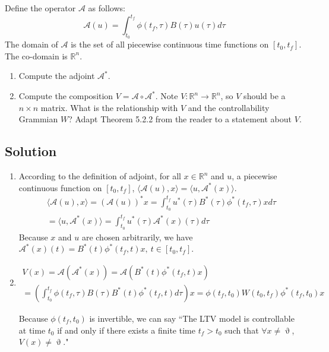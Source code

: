 \documentclass[11pt]{report}
\newcommand{\mc}{\mathcal}
\newcommand{\mb}{\mathbb}
\begin{document}
Define the operator $\mc{A}$ as follows:
\[
\mc{A}(u) = \int_{t_0}^{t_f} \phi(t_f,\tau) B(\tau) u(\tau) d\tau
\]
The domain of $\mc{A}$ is the set of all piecewise continuous time functions on $[t_0,t_f]$. The co-domain is $\mb{R}^n$.

\begin{enumerate}[label=\alph*)]
\item
Compute the adjoint $\mc{A}^*$.
\item
Compute the composition $V = \mc{A} \circ \mc{A}^*$. Note $V: \mb{R}^n \rightarrow \mb{R}^n$, so $V$ should be a $n \times n$ matrix. What is the relationship with $V$ and the controllability Grammian $W$? Adapt Theorem 5.2.2 from the reader to a statement about $V$.
\end{enumerate}


\subsection*{Solution}
\begin{enumerate}[label=\alph*)]
\item
According to the definition of adjoint, for all $x \in \mb{R}^n$ and $u$, a piecewise continuous function on $[t_0,t_f]$, $\langle\mc{A}(u), x\rangle = \langle u, \mc{A}^*(x)\rangle$.
\begin{multline*}
  \langle\mc{A}(u), x\rangle = (\mc{A}(u))^* x = \int_{t_0}^{t_f} u^*(\tau) B^*(\tau) \phi^*(t_f,\tau) x d\tau\\
  = \langle u, \mc{A}^*(x)\rangle = \int_{t_0}^{t_f} u^*(\tau) \mc{A}^*(x)(\tau) d\tau
\end{multline*}
Because $x$ and $u$ are chosen arbitrarily, we have $\mc{A}^*(x)(t) = B^*(t) \phi^*(t_f,t) x,~t \in [t_0, t_f]$.
\item
\begin{multline*}
V(x) = \mc{A}(\mc{A}^*(x)) = \mc{A}(B^*(t) \phi^*(t_f,t) x)\\
= (\int_{t_0}^{t_f} \phi(t_f,\tau) B(\tau) B^*(t) \phi^*(t_f,t) d\tau) x
= \phi(t_f,t_0) W(t_0, t_f) \phi^*(t_f,t_0) x
\end{multline*}

Because $\phi(t_f,t_0)$ is invertible, we can say ``The LTV model is controllable at time $t_0$ if and only if there exists a finite time $t_f>t_0$ such that $\forall x \neq \upvartheta$, $V(x) \neq \upvartheta$."
\end{enumerate}
\end{document}
